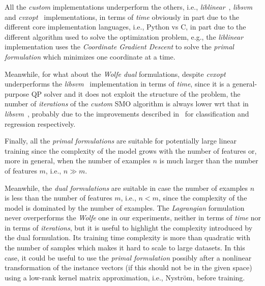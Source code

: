 \bigskip

All the \emph{custom} implementations underperform the others, i.e., \emph{liblinear}~\cite{fan2008liblinear}, \emph{libsvm}~\cite{chang2011libsvm} and \emph{cvxopt}~\cite{vandenberghe2010cvxopt} implementations, in terms of \emph{time} obviously in part due to the different core implementation languages, i.e., Python vs C, in part due to the different algorithm used to solve the  optimization problem, e.g., the \emph{liblinear}~\cite{fan2008liblinear} implementation uses the \emph{Coordinate Gradient Descent} to solve the \emph{primal formulation} which minimizes one coordinate at a time.

Meanwhile, for what about the \emph{Wolfe dual} formulations, despite \emph{cvxopt}~\cite{vandenberghe2010cvxopt} underperforms the \emph{libsvm}~\cite{chang2011libsvm} implementation in terms of \emph{time}, since it is a general-purpose QP solver and it does not exploit the structure of the problem, the number of \emph{iterations} of the \emph{custom} SMO algorithm is always lower wrt that in \emph{libsvm}~\cite{chang2011libsvm}, probably due to the improvements described in~\cite{keerthi2001improvements, shevade1999improvements} for classification and regression respectively.

\bigskip

Finally, all the \emph{primal formulations} are suitable for potentially large linear training since the complexity of the model grows with the number of features or, more in general, when the number of examples $n$ is much larger than the number of features $m$, i.e., $n \gg m$.

Meanwhile, the \emph{dual formulations} are suitable in case the number of examples $n$ is less than the number of features $m$, i.e., $n < m$, since the complexity of the model is dominated by the number of examples. The \emph{Lagrangian} formulation never overperforms the \emph{Wolfe} one in our experiments, neither in terms of \emph{time} nor in terms of \emph{iterations}, but it is useful to highlight the complexity introduced by the dual formulation. Its training time complexity is more than quadratic with the number of samples which makes it hard to scale to large datasets. In this case, it could be useful to use the \emph{primal formulation} possibly after a nonlinear transformation of the instance vectors (if this should not be in the given space) using a low-rank kernel matrix approximation, i.e., Nyström, before training.